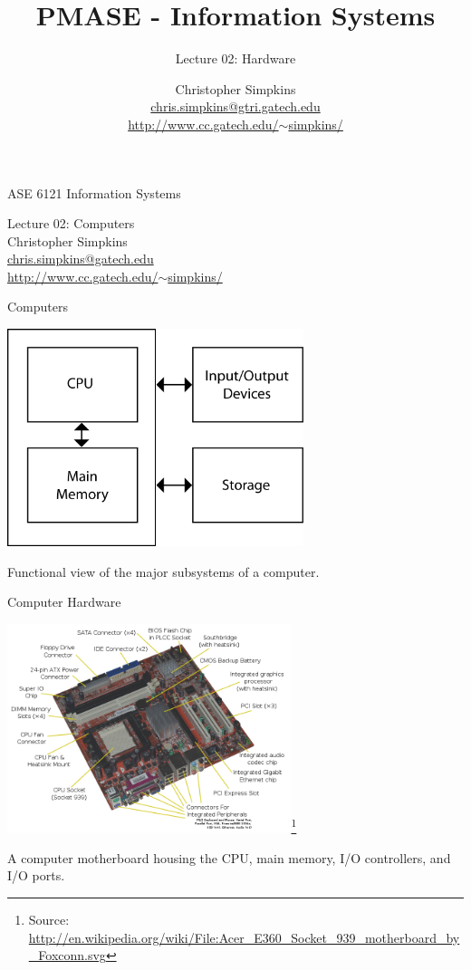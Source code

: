 \documentclass{beamer}
\title[Information Systems] %
{PMASE - Information Systems}
\subtitle{Lecture 02: Hardware}
\author[Chris Simpkins] %
{Christopher Simpkins\\\href{mailto:chris.simpkins@gtri.gatech.edu}{chris.simpkins@gtri.gatech.edu}\\\href{http://www.cc.gatech.edu/~simpkins/}{http://www.cc.gatech.edu/$\sim$simpkins/}}
\institute[GTRI] %
\date[] %
{}
\begin{document}
\begin{frame}{ASE 6121 Information Systems}

\begin{center}
{\LARGE Lecture 02: Computers}\\
\vspace{.2in}
{\Large Christopher Simpkins}\\
{\large \href{mailto:chris.simpkins@gatech.edu}{chris.simpkins@gatech.edu}}\\
{\large \href{http://www.cc.gatech.edu/~simpkins/}{http://www.cc.gatech.edu/$\sim$simpkins/}}
\end{center}

\end{frame}

\begin{frame}{Computers}

\begin{center}
\includegraphics[height=2.5in]{computer-block-diagram.png}
\end{center}
Functional view of the major subsystems of a computer.  
\end{frame}

\begin{frame}{Computer Hardware}

\begin{center}
\includegraphics[height=2.4in]{acer-motherboard.png}\footnote{Source:
  \url{http://en.wikipedia.org/wiki/File:Acer_E360_Socket_939_motherboard_by_Foxconn.svg}}
\end{center}
A computer motherboard housing the CPU, main memory, I/O controllers,
and I/O ports.

\end{frame}
\end{document}
